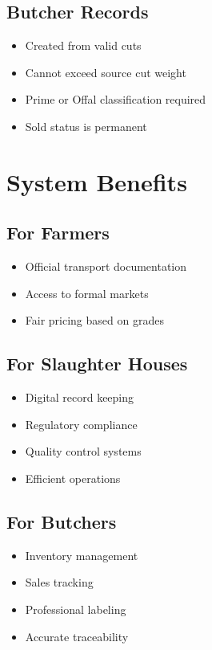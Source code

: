 \documentclass[11pt,a4paper]{article}
\begin{document}
\subsection{Butcher Records}
\begin{itemize}[leftmargin=*]
    \item Created from valid cuts
    \item Cannot exceed source cut weight
    \item Prime or Offal classification required
    \item Sold status is permanent
\end{itemize}

\section{System Benefits}

\subsection{For Farmers}
\begin{itemize}[leftmargin=*]
    \item Official transport documentation
    \item Access to formal markets
    \item Fair pricing based on grades
\end{itemize}

\subsection{For Slaughter Houses}
\begin{itemize}[leftmargin=*]
    \item Digital record keeping
    \item Regulatory compliance
    \item Quality control systems
    \item Efficient operations
\end{itemize}

\subsection{For Butchers}
\begin{itemize}[leftmargin=*]
    \item Inventory management
    \item Sales tracking
    \item Professional labeling
    \item Accurate traceability
\end{itemize}
\end{document}
